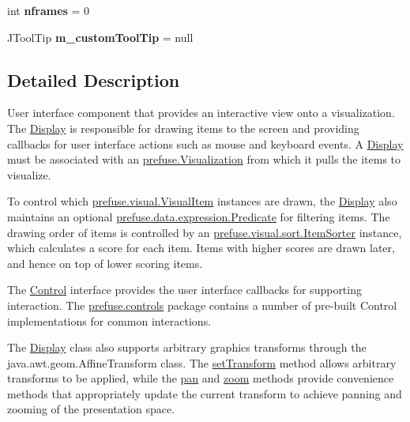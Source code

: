 \begin{DoxyCompactItemize}
\item 
\hypertarget{classprefuse_1_1_display_aca4eda57c80ba106743f86cc17617e56}{int {\bfseries nframes} = 0}\label{classprefuse_1_1_display_aca4eda57c80ba106743f86cc17617e56}

\item 
\hypertarget{classprefuse_1_1_display_aae09e42a239d8f1acf52591133ea9b32}{\-J\-Tool\-Tip {\bfseries m\-\_\-custom\-Tool\-Tip} = null}\label{classprefuse_1_1_display_aae09e42a239d8f1acf52591133ea9b32}

\end{DoxyCompactItemize}


\subsection{\-Detailed \-Description}
\-User interface component that provides an interactive view onto a visualization. \-The \hyperlink{classprefuse_1_1_display}{\-Display} is responsible for drawing items to the screen and providing callbacks for user interface actions such as mouse and keyboard events. \-A \hyperlink{classprefuse_1_1_display}{\-Display} must be associated with an \hyperlink{classprefuse_1_1_visualization}{prefuse.\-Visualization} from which it pulls the items to visualize. 

\-To control which \hyperlink{}{prefuse.\-visual.\-Visual\-Item} instances are drawn, the \hyperlink{classprefuse_1_1_display}{\-Display} also maintains an optional \hyperlink{}{prefuse.\-data.\-expression.\-Predicate} for filtering items. \-The drawing order of items is controlled by an \hyperlink{}{prefuse.\-visual.\-sort.\-Item\-Sorter} instance, which calculates a score for each item. \-Items with higher scores are drawn later, and hence on top of lower scoring items. 

\-The \hyperlink{}{\-Control} interface provides the user interface callbacks for supporting interaction. \-The \hyperlink{}{prefuse.\-controls} package contains a number of pre-\/built {\ttfamily \-Control} implementations for common interactions.

\-The \hyperlink{classprefuse_1_1_display}{\-Display} class also supports arbitrary graphics transforms through the {\ttfamily java.\-awt.\-geom.\-Affine\-Transform} class. \-The \hyperlink{}{set\-Transform} method allows arbitrary transforms to be applied, while the \hyperlink{classprefuse_1_1_display_a065163ab976fc2b8c7884373af759895}{pan} and \hyperlink{}{zoom} methods provide convenience methods that appropriately update the current transform to achieve panning and zooming of the presentation space.

